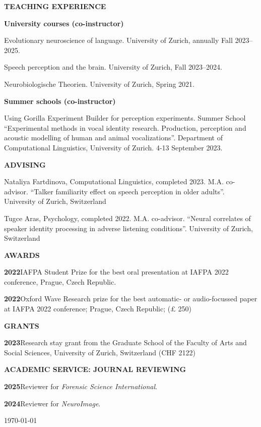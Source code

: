 \documentclass[11pt]{article}
\newcommand{\hangpara}{
 \setlength{\parindent}{0in} %
 \hangindent=0.42in %
}
\begin{document}
\vskip 20pt
\begin{flushleft}
{\bf TEACHING EXPERIENCE}
\end{flushleft}
\begin{flushleft}
{\bf University courses (co-instructor)}
\end{flushleft}
\hangpara Evolutionary neuroscience of language. University of Zurich, annually Fall 2023--2025.
\vskip 6pt
\hangpara Speech perception and the brain. University of Zurich, Fall 2023--2024.
\vskip 6pt
\hangpara Neurobiologische Theorien. University of Zurich, Spring 2021.

\begin{flushleft}
{\bf Summer schools (co-instructor)}
\end{flushleft}
\hangpara Using Gorilla Experiment Builder for perception experiments. Summer School “Experimental methods in vocal identity research. Production, perception and acoustic modelling of human and animal vocalizations”. Department of Computational Linguistics, University of Zurich. 4-13 September 2023.




\vskip 20pt
\begin{flushleft}
{\bf ADVISING}
\end{flushleft}
\hangpara Nataliya Fartdinova, Computational Linguistics, completed 2023. M.A. co-advisor. “Talker familiarity effect on speech perception in older adults”. University of Zurich, Switzerland
\vskip 6pt
\hangpara Tugce Aras, Psychology, completed 2022. M.A. co-advisor. “Neural correlates of speaker identity processing in adverse listening conditions”. University of Zurich, Switzerland




\vskip 20pt
\begin{flushleft}
{\bf AWARDS}
\end{flushleft}
\hangpara
{\bf 2022}\hspace{1ex}IAFPA Student Prize for the best oral presentation at IAFPA 2022 conference, Prague, Czech Republic.
\vskip 6pt
\hangpara
{\bf 2022}\hspace{1ex}Oxford Wave Research prize for the best automatic- or audio-focussed paper at IAFPA 2022 conference; Prague, Czech Republic; (£ 250)




\vskip 20pt
\begin{flushleft}
{\bf GRANTS}
\end{flushleft}
\hangpara
{\bf 2023}\hspace{1ex}Research stay grant from the Graduate School of the Faculty of Arts and Social Sciences, University of Zurich, Switzerland (CHF 2122)




\vskip 20pt
\begin{flushleft}
{\bf ACADEMIC SERVICE: JOURNAL REVIEWING}
\end{flushleft}
\hangpara
{\bf 2025}\hspace{1ex}Reviewer for \textit{Forensic Science International}.
\vskip 6pt
\hangpara
{\bf 2024}\hspace{1ex}Reviewer for \textit{NeuroImage}.



\vskip 20pt
\today
\end{document}
